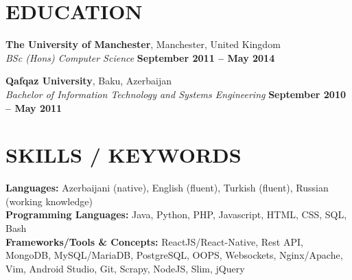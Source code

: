 \documentclass[margin,line]{resume}
\begin{document}
\begin{resume}
\sectionline

    \section{\mysidestyle \textbf{\large{E}\small{DUCATION}}}

    \textbf{\listing The University of Manchester}, Manchester, United Kingdom \vspace{1mm}\\
    \textsl{BSc (Hons) Computer Science} \hfill \textbf{September 2011 -- May 2014}\vspace{-3mm}\\\vspace{-1mm}%

    \textbf{\listing Qafqaz University}, Baku, Azerbaijan \vspace{1mm}\\
    \textsl{Bachelor of Information Technology and Systems Engineering} \hfill \textbf{September 2010 -- May 2011}\vspace{-3mm}\\\vspace{-1mm}%

    \vspace{-1mm}

\sectionline

    \section{\mysidestyle \textbf{\large{S}\small{KILLS} / \large{K}\small{EYWORDS}}}

    \textbf{Languages:} Azerbaijani (native), English (fluent), Turkish (fluent), Russian (working knowledge)\vspace{1mm}\\
    \textbf{Programming Languages:} Java, Python, PHP, Javascript, HTML, CSS, SQL, Bash\vspace{1mm}\\
    \textbf{Frameworks/Tools \& Concepts:} ReactJS/React-Native, Rest API, MongoDB, MySQL/MariaDB, PostgreSQL, OOPS, Websockets, Nginx/Apache, Vim, Android Studio, Git, Scrapy, NodeJS, Slim, jQuery\vspace{1mm}\\
 



\end{resume}
\end{document}
